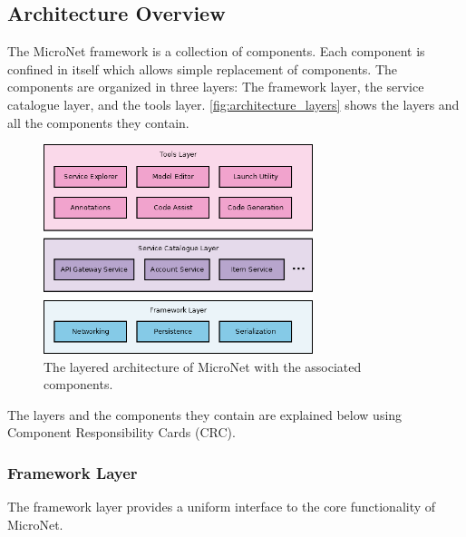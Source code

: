 \subsection{Architecture Overview}

The MicroNet framework is a collection of components. Each component is
confined in itself which allows simple replacement of components. The components
are organized in three layers: The framework layer, the service catalogue layer,
and the tools layer. \autoref{fig:architecture_layers} shows the layers and all
the components they contain.

\begin{figure}
  \centering
  \includegraphics[width=0.7\textwidth]{images/architecture/ArchitectureLayers}
  \caption{The layered architecture of MicroNet with the associated components.}
  \label{fig:architecture_layers}
\end{figure}


The layers and the components they contain are explained below using Component
Responsibility Cards (CRC).

\subsubsection{Framework Layer}

The framework layer provides a uniform interface to the core functionality of
MicroNet.\\

